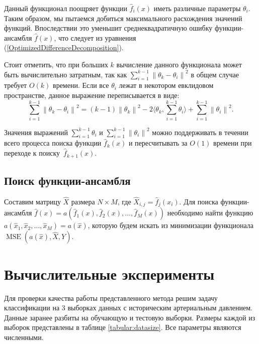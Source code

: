 \documentclass[12pt, fleqn]{article}
\newcommand{\norm}[1]{\left\lVert#1\right\rVert}
\newcommand{\mse}{\mathop{MSE}}
\newcommand{\scalarproduct}[1]{\langle #1 \rangle}
\newcommand{\predictionfunction}{\hat{f}}
\newcommand{\ensemblefunction}{a}
\newcommand{\objects}{X}
\newcommand{\results}{Y}
\newcommand{\predictedobjects}{\widehat{\objects}}
\newcommand{\numberobjects}{N}
\newcommand{\numberpredictionfunctions}{M}
\newcommand{\for}[3]{\sum\limits_{#1 = #2}^{#3}}  %
\newcommand{\forn}[2]{\for{#1}{1}{#2}}  %
\newcommand{\many}[3]{#1 1 #2, #1 2 #2, \dots, #1 #3 #2}  %
\newcommand{\reference}[1]{(\hyperref[#1]{\ref{#1}})}
\newcommand{\ensemblefunctionfull}{\ensemblefunction(\many{\predictionfunction_}{(x)}{\numberpredictionfunctions})}
\begin{document}
Данный функционал поощряет функции $\predictionfunction_i(x)$ иметь различные параметры $\theta_i$. Таким образом, мы пытаемся добиться максимального расхождения значений функций. Впоследствии это уменьшит среднеквадратичную ошибку функции-ансамбля $\predictionfunction(x)$, что следует из уравнения \reference{OptimizedDifferenceDecomposition}.

Стоит отметить, что при больших $k$ вычисление данного функционала может быть вычислительно затратным, так как $\forn{i}{k - 1}\norm{\theta_k - \theta_i}^2$ в общем случае требует $O(k)$ времени. Если все $\theta_i$ лежат в некотором евклидовом пространстве, данное выражение переписывается в виде:
$$
\forn{i}{k - 1}\norm{\theta_k - \theta_i}^2 = (k - 1)\norm{\theta_k}^2 - 2\scalarproduct{\theta_k, \forn{i}{k - 1} \theta_i} + \forn{i}{k - 1}\norm{\theta_i}^2.
$$

Значения выражений $\forn{i}{k - 1} \theta_i$ и $\forn{i}{k - 1}\norm{\theta_i}^2$ можно поддерживать в течении всего процесса поиска функции $\predictionfunction_k(x)$ и пересчитывать за $O(1)$ времени при переходе к поиску~$\predictionfunction_{k+1}(x)$.

\subsection{Поиск функции-ансамбля}

Составим матрицу $\predictedobjects$ размера $\numberobjects \times \numberpredictionfunctions$, где $\predictedobjects_{i, j} = \predictionfunction_j(x_i)$.
Для поиска функции-ансамбля $\predictionfunction(x) = \ensemblefunctionfull$ необходимо найти функцию $\ensemblefunction(\many{\hat{x}_}{}{\numberpredictionfunctions}) = \ensemblefunction(\hat{x})$, которую будем искать
из минимизации функционала $\mse(\ensemblefunction(\hat{x}), \predictedobjects, \results)$.

\section{Вычислительные эксперименты}

Для проверки качества работы представленного метода решим задачу классификации на 3 выборках данных с историческим артериальным давлением. Данные заранее разбиты на обучающую и тестовую выборки. Размеры каждой из выборок представлены в таблице \ref{tabular:datasize}. Все параметры являются численными.
\end{document}
